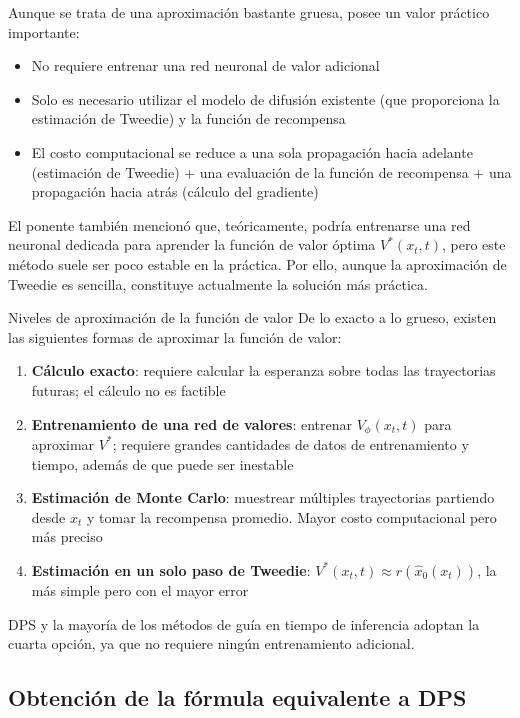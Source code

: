 Aunque se trata de una aproximación bastante gruesa, posee un valor práctico importante:

\begin{itemize}
    \item No requiere entrenar una red neuronal de valor adicional
    \item Solo es necesario utilizar el modelo de difusión existente (que proporciona la estimación de Tweedie) y la función de recompensa
    \item El costo computacional se reduce a una sola propagación hacia adelante (estimación de Tweedie) + una evaluación de la función de recompensa + una propagación hacia atrás (cálculo del gradiente)
\end{itemize}

El ponente también mencionó que, teóricamente, podría entrenarse una red neuronal dedicada para aprender la función de valor óptima $V^*(x_t, t)$, pero este método suele ser poco estable en la práctica. Por ello, aunque la aproximación de Tweedie es sencilla, constituye actualmente la solución más práctica.

\begin{warningbox}{Niveles de aproximación de la función de valor}
De lo exacto a lo grueso, existen las siguientes formas de aproximar la función de valor:
\begin{enumerate}
    \item \textbf{Cálculo exacto}: requiere calcular la esperanza sobre todas las trayectorias futuras; el cálculo no es factible
    \item \textbf{Entrenamiento de una red de valores}: entrenar $V_\phi(x_t, t)$ para aproximar $V^*$; requiere grandes cantidades de datos de entrenamiento y tiempo, además de que puede ser inestable
    \item \textbf{Estimación de Monte Carlo}: muestrear múltiples trayectorias partiendo desde $x_t$ y tomar la recompensa promedio. Mayor costo computacional pero más preciso
    \item \textbf{Estimación en un solo paso de Tweedie}: $V^*(x_t, t) \approx r(\hat{x}_0(x_t))$, la más simple pero con el mayor error
\end{enumerate}
DPS y la mayoría de los métodos de guía en tiempo de inferencia adoptan la cuarta opción, ya que no requiere ningún entrenamiento adicional.
\end{warningbox}

\subsection{Obtención de la fórmula equivalente a DPS}

